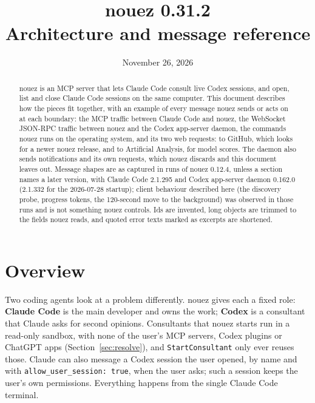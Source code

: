 \documentclass[10pt,a4paper]{article}
\title{\textbf{nouez} 0.31.2\\[0.3em]\large Architecture and message reference}
\date{November 26, 2026}
\author{}
\newcommand{\code}[1]{\texttt{#1}}
\newcommand{\ccname}{\textcolor{cc}{\textbf{Claude Code}}}
\newcommand{\cxname}{\textcolor{cx}{\textbf{Codex}}}
\begin{document}
\maketitle
\vspace{-2em}

\begin{abstract}
\noindent nouez is an MCP server that lets Claude Code consult live Codex sessions, and open, list and
close Claude Code sessions on the same computer. This document
describes how the pieces fit together, with an example of every message nouez sends
or acts on at each boundary: the MCP traffic between Claude Code and nouez, the WebSocket
JSON-RPC traffic between nouez and the Codex app-server daemon, the commands nouez runs on
the operating system, and its two web requests: to GitHub, which looks for a newer nouez release,
and to Artificial Analysis, for model scores. The daemon also sends notifications and its own requests, which nouez
discards and this document leaves out. Message shapes are as captured in runs of nouez 0.12.4,
unless a section names a later version, with Claude Code
2.1.295 and Codex app-server daemon 0.162.0 (2.1.332 for the 2026-07-28 startup); client behaviour
described here (the discovery probe, progress tokens, the 120-second move to the background) was observed in those runs and is
not something nouez controls. Ids are invented, long objects are trimmed to the fields nouez
reads, and quoted error texts marked as excerpts are shortened.
\end{abstract}

\tableofcontents
\newpage

\section{Overview}

Two coding agents look at a problem differently. nouez gives each a fixed role:
\ccname{} is the main developer and owns the work; \cxname{} is a consultant that Claude asks
for second opinions. Consultants that nouez starts run in a read-only sandbox, with none of the
user's MCP servers, Codex plugins or ChatGPT apps (Section~\ref{sec:resolve}), and
\code{StartConsultant} only ever reuses those. Claude can also message a Codex session the user
opened, by name and with \code{allow\_user\_session: true}, when the user asks; such a session
keeps the user's own permissions. Everything
happens from the single Claude Code terminal.
\end{document}
